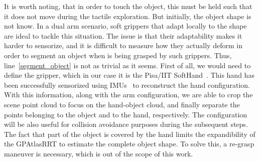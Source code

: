 It is worth noting, that in order to touch the object, this must be held such that it does not move during the tactile exploration. But initially, the object shape is not know. In a dual arm scenario, soft grippers that adapt locally to the shape are ideal to tackle this situation. The issue is that their adaptability makes it harder to sensorize, and it is difficult to measure how they actually deform in order to segment an object when is being grasped by such grippers. Thus, line~\ref{segment_object} is not as trivial as it seems. First of all, we would need to define the gripper, which in our case it is the Pisa/IIT SoftHand~\citep{Catalano2014Adaptive}. This hand has been successfully sensorized using IMUs~\citep{Santaera2015Lowcost} to reconstruct the hand configuration. With this information, along with the arm configuration, we are able to crop the scene point cloud to focus on the hand-object cloud, and finally separate the points belonging to the object and to the hand, respectively. The configuration will be also useful for collision avoidance purposes during the subsequent steps. The fact that part of the object is covered by the hand limits the expandibility of the GPAtlasRRT to estimate the complete object shape. To solve this, a re-grasp maneuver is necessary, which is out of the scope of this work.

